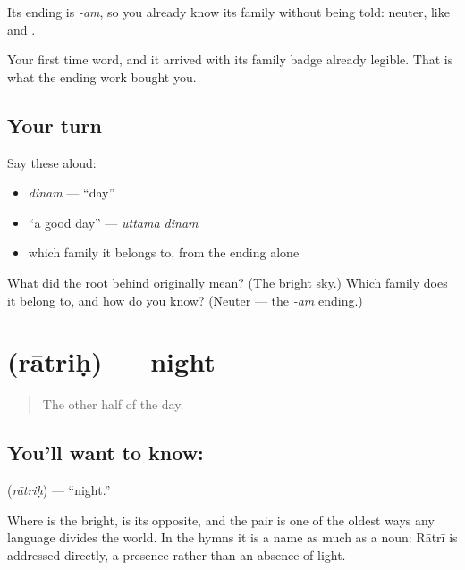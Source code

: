 Its ending is \emph{-am}, so you already know its family without being told: neuter, like  and .

\begin{grammarlens}[title={What you've built}]
Your first time word, and it arrived with its family badge already legible. That is what the ending work bought you.
\end{grammarlens}

\subsection*{Your turn}
Say these aloud:

\begin{itemize}
\raggedright
  \item \emph{dinam} — \textquotedblleft{}day\textquotedblright{}
  \item \textquotedblleft{}a good day\textquotedblright{} — \emph{uttama dinam}
  \item which family it belongs to, from the ending alone
\end{itemize}

\begin{tcolorbox}[breakable,colback=teal!4,colframe=teal!35!black,title={Before you move on}]
What did the root behind  originally mean? (The bright sky.) Which family does it belong to, and how do you know? (Neuter — the \emph{-am} ending.)
\end{tcolorbox}
\section[\texorpdfstring{\sk{रात्रिः} (rātriḥ)}{रात्रिः (rātriḥ)}]{ (rātriḥ) — night}

\label{lesson:SA-C17-night}



\begin{quote}
The other half of the day.
\end{quote}

\subsection*{You'll want to know: }
\textbf{} (\emph{rātriḥ}) — \textquotedblleft{}night.\textquotedblright{}

Where  is the bright,  is its opposite, and the pair is one of the oldest ways any language divides the world. In the hymns it is a name as much as a noun: Rātrī is addressed directly, a presence rather than an absence of light.

